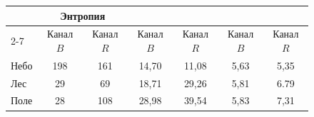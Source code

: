 \begin{figure}
{\begin{center}
\begin{tabular}{|l|c|c|c|c|c|c|}
&\multicolumn{2}{c|}{Энтропия}\\


\cline{2-7}


&Канал $B$&Канал $R$&Канал $B$&Канал $R$&Канал $B$&Канал $R$\\


\hline


Небо&198\hphantom{9}& 161 &14,70&11,08 &5,63&5,35\\


Лес&29&\hphantom{9}69&18,71&29,26&5,81&6.79\\


Поле&28&108 &28,98&39,54 &5,83&7,31\\


\hline


\end{tabular}


\end{center}}


\vspace*{9pt}


\end{figure}





\renewcommand{\figurename}{\protect\bf Рис.}


\renewcommand{\tablename}{\protect\bf Таблица}





\setcounter{figure}{5}


\setcounter{table}{1}








